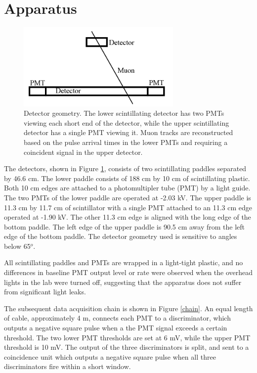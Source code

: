 \section{Apparatus}

\begin{figure}[htb]
\includegraphics[width=8cm]{paddles.png}
\caption{Detector geometry. The lower scintillating detector has two PMTs viewing each short end of the detector, while the upper scintillating detector has a single PMT viewing it. Muon tracks are reconstructed based on the pulse arrival times in the lower PMTs and requiring a coincident signal in the upper detector. }
\label{paddles}
\end{figure}

The detectors, shown in Figure \ref{paddles}, consists of two scintillating paddles separated by 46.6 cm. The lower paddle consists of 188 cm by 10 cm of scintillating plastic. Both 10 cm edges are attached to a photomultipler tube (PMT) by a light guide. The two PMTs of the lower paddle are operated at -2.03 kV. The upper paddle is 11.3 cm by 11.7 cm of scintillator with a single PMT attached to an 11.3 cm edge operated at -1.90 kV. The other 11.3 cm edge is aligned with the long edge of the bottom paddle. The left edge of the upper paddle is 90.5 cm away from the left edge of the bottom paddle. The detector geometry used is sensitive to angles below 65$^o$. 


All scintillating paddles and PMTs are wrapped in a light-tight plastic, and no differences in baseline PMT output level or rate were observed when the overhead lights in the lab were turned off, suggesting that the apparatus does not suffer from significant light leaks. 

The subsequent data acquisition chain is shown in Figure \ref{chain}. An equal length of cable, approximately 4 m, connects each PMT to a discriminator, which outputs a negative square pulse when a the PMT signal exceeds a certain threshold. The two lower PMT thresholds are set at 6 mV, while the upper PMT threshold is 10 mV. The output of the three discriminators is split, and sent to a coincidence unit which outputs a negative square pulse when all three discriminators fire within a short window. 

